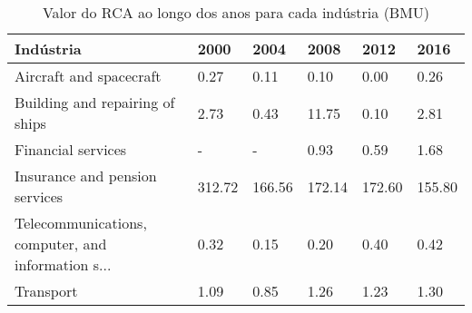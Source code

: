 \begin{table}
\centering
\caption{Valor do RCA ao longo dos anos para cada indústria (BMU)}
\label{tab:ex3-tempo-BMU}
\begin{tabular}{p{6cm}p{1.5cm}p{1.5cm}p{1.5cm}p{1.5cm}p{1.5cm}}
\toprule
                                         Indústria &   2000 &   2004 &   2008 &   2012 &   2016 \\
\midrule
                           Aircraft and spacecraft &   0.27 &   0.11 &   0.10 &   0.00 &   0.26 \\
                   Building and repairing of ships &   2.73 &   0.43 &  11.75 &   0.10 &   2.81 \\
                                Financial services &      - &      - &   0.93 &   0.59 &   1.68 \\
                    Insurance and pension services & 312.72 & 166.56 & 172.14 & 172.60 & 155.80 \\
Telecommunications, computer, and information s... &   0.32 &   0.15 &   0.20 &   0.40 &   0.42 \\
                                         Transport &   1.09 &   0.85 &   1.26 &   1.23 &   1.30 \\
\bottomrule
\end{tabular}
\end{table}
